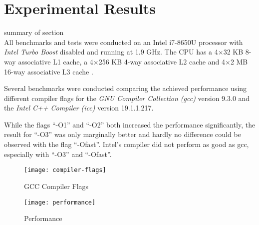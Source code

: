 \section{Experimental Results}\label{sec:exp}

summary of section\\

 All benchmarks and tests were conducted on an Intel
i7-8650U processor with \textit{Intel Turbo Boost} disabled and running at 1.9
GHz. The CPU has a 4$\times$32 KB 8-way associative L1 cache, a 4$\times$256 KB
4-way associative L2 cache and 4$\times$2 MB 16-way associative L3 cache
\cite{intel-opt-manual}.

 Several benchmarks were conducted comparing the achieved
performance using different compiler flags for the \textit{GNU Compiler
  Collection (gcc)} version 9.3.0 and the \textit{Intel C++ Compiler (icc)}
version 19.1.1.217.

While the flags ``-O1'' and ``-O2'' both increased the performance
significantly, the result for ``-O3'' was only marginally better and hardly no
difference could be observed with the flag ``-Ofast''. Intel's compiler did not
perform as good as gcc, especially with ``-O3'' and ``-Ofast''.


\begin{figure}[ht]
  \texttt{[image: compiler-flags]}
  \caption{GCC Compiler Flags}
\end{figure}


\begin{figure}[ht]
  \texttt{[image: performance]}
  \caption{Performance}
\end{figure}





